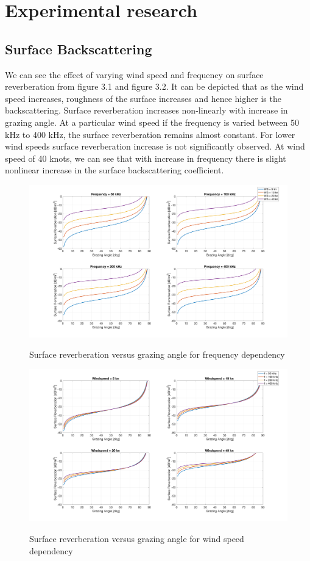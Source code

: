\chapter{Experimental research} \label{Experimental research}
\section{ Surface Backscattering } \label{ Surface Backscattering } 
\noindent  We can see the effect of varying wind speed and frequency on surface reverberation from figure 3.1 and figure 3.2. It can be depicted that as the wind speed increases, roughness of the surface increases and hence higher is the backscattering. Surface reverberation increases non-linearly with increase in grazing angle. At a particular wind speed if the frequency is varied between 50 kHz to 400 kHz, the surface reverberation remains almost constant. For lower wind speeds surface reverberation increase is not significantly observed. At wind speed of 40 knots, we can see that with increase in frequency there is slight nonlinear increase in the surface backscattering coefficient.

\begin{figure}[H]
\centering
{\includegraphics[scale=0.18]{usp3_1.png}}
\caption{Surface reverberation versus grazing angle for frequency dependency}
\end{figure}

\begin{figure}[H]
\centering
{\includegraphics[scale=0.18]{usp3_2.png}}
\caption{Surface reverberation versus grazing angle for wind speed dependency}
\end{figure}

